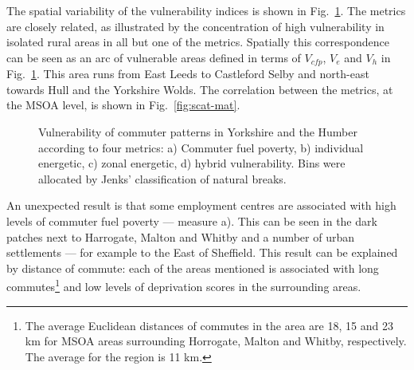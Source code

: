 % 
The spatial variability of the vulnerability indices is shown in
Fig.~\ref{fig:ve}.
The metrics are closely related, as illustrated by the concentration of
high vulnerability in isolated rural areas in all but one of the metrics.
Spatially this correspondence can be seen as an arc of vulnerable areas
defined in terms of $V_{cfp}$, $V_e$ and $V_h$ in Fig.~\ref{fig:ve}.  This
area runs from East Leeds to Castleford Selby and north-east towards Hull and
the Yorkshire Wolds.
The correlation between the metrics, at the MSOA level, is shown in
Fig.~\ref{fig:scat-mat}.


\begin{figure}[pth]
 \centering
 \caption[Vulnerability of commuter patterns in Yorkshire and the Humber]
 {Vulnerability of commuter patterns in Yorkshire and the Humber
according to four metrics: a) Commuter fuel poverty, b) individual
energetic, c) zonal energetic, d) hybrid vulnerability. Bins
were allocated by Jenks' classification of natural breaks.}
 \label{fig:ve}
\end{figure}

An unexpected result is that some employment centres are associated
with high levels of commuter fuel poverty --- measure a).
This can be seen in the dark patches next to Harrogate, Malton and Whitby
and a number of urban settlements --- for example to the East of Sheffield.
This result can be explained by distance of commute: each of the areas mentioned
is associated with long commutes\footnote{The average Euclidean distances
of commutes in the area are 18, 15 and 23 km for MSOA areas surrounding
Horrogate, Malton and Whitby, respectively. The average for the region
is 11 km.}  and low levels of deprivation
scores in the surrounding areas.

